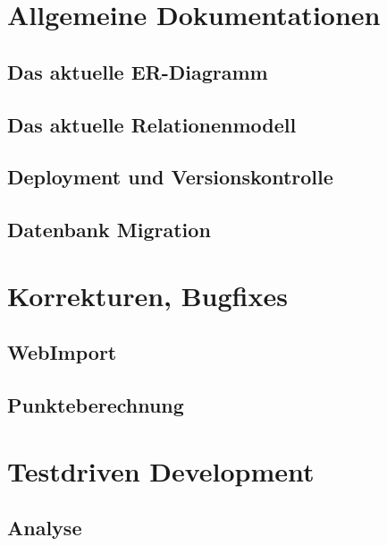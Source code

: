 \documentclass[12pt,             %
               a4paper,          %
               listof=totoc,     %
               index=totoc,      %
               bibliography=totoc,%
               oneside,         %
               BCOR1cm,          %
               english   %
               ]{scrbook}
\begin{document}
\clearpage
\chapter{Allgemeine Dokumentationen}
\section{Das aktuelle ER-Diagramm}

\section{Das aktuelle Relationenmodell}

\section{Deployment und Versionskontrolle}

\section{Datenbank Migration}

\clearpage
\chapter{Korrekturen, Bugfixes}
\section{WebImport}

\section{Punkteberechnung}

\clearpage
\chapter{Testdriven Development}
\section{Analyse}
\end{document}
